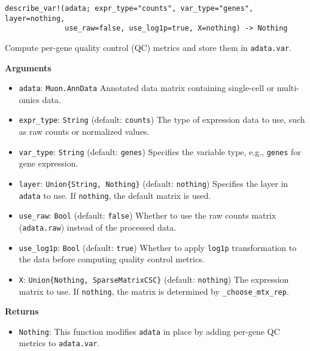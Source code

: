 \documentclass[oneside]{memoir}
\begin{document}
\begin{adjustwidth}{2em}{0pt}


\begin{verbatim}
describe_var!(adata; expr_type="counts", var_type="genes", layer=nothing, 
              use_raw=false, use_log1p=true, X=nothing) -> Nothing
\end{verbatim}

Compute per-gene quality control (QC) metrics and store them in \texttt{adata.var}.

\textbf{Arguments}

\begin{itemize}
\item \texttt{adata}: \texttt{Muon.AnnData}   Annotated data matrix containing single-cell or multi-omics data.


\item \texttt{expr\_type}: \texttt{String} (default: \texttt{{\textquotedbl}counts{\textquotedbl}})   The type of expression data to use, such as raw counts or normalized values.


\item \texttt{var\_type}: \texttt{String} (default: \texttt{{\textquotedbl}genes{\textquotedbl}})   Specifies the variable type, e.g., \texttt{{\textquotedbl}genes{\textquotedbl}} for gene expression.


\item \texttt{layer}: \texttt{Union\{String, Nothing\}} (default: \texttt{nothing})   Specifies the layer in \texttt{adata} to use. If \texttt{nothing}, the default matrix is used.


\item \texttt{use\_raw}: \texttt{Bool} (default: \texttt{false})   Whether to use the raw counts matrix (\texttt{adata.raw}) instead of the processed data.


\item \texttt{use\_log1p}: \texttt{Bool} (default: \texttt{true})   Whether to apply \texttt{log1p} transformation to the data before computing quality control metrics.


\item \texttt{X}: \texttt{Union\{Nothing, SparseMatrixCSC\}} (default: \texttt{nothing})   The expression matrix to use. If \texttt{nothing}, the matrix is determined by \texttt{\_choose\_mtx\_rep}.

\end{itemize}
\textbf{Returns}

\begin{itemize}
\item \texttt{Nothing}:   This function modifies \texttt{adata} in place by adding per-gene QC metrics to \texttt{adata.var}.


\end{itemize}
\end{adjustwidth}
\end{document}
